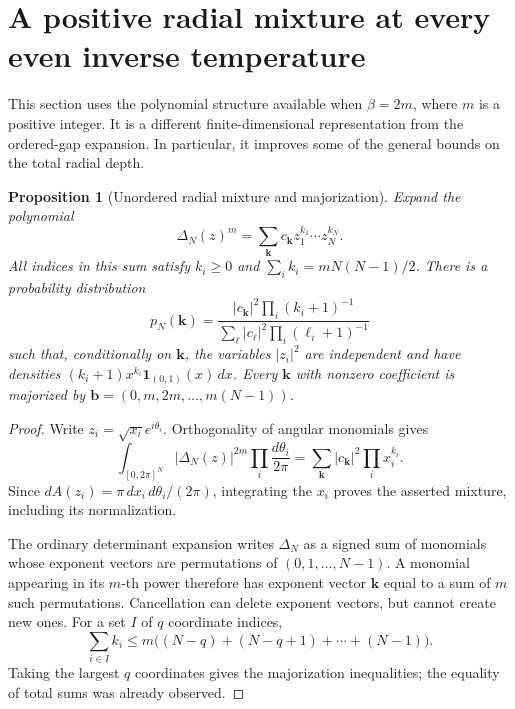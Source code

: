 \documentclass[11pt,a4paper]{article}
\numberwithin{equation}{section}
\newtheorem{proposition}[theorem]{Proposition}
\theoremstyle{definition}
\theoremstyle{remark}
\begin{document}
\section{A positive radial mixture at every even inverse temperature}
\label{sec:even-beta-radial-mixture}

This section uses the polynomial structure available when $\beta=2m$,
where $m$ is a positive integer. It is a different finite-dimensional
representation from the ordered-gap expansion. In particular, it improves
some of the general bounds on the total radial depth.

\begin{proposition}[Unordered radial mixture and majorization]
\label{prop:even-beta-radial-mixture}
Expand the polynomial
\[
 \Delta_N(z)^m=\sum_{\mathbf k}c_{\mathbf k}
                    z_1^{k_1}\cdots z_N^{k_N}.
\]
All indices in this sum satisfy $k_i\geq0$ and
$\sum_i k_i=mN(N-1)/2$. There is a probability distribution
\begin{equation}
 p_N(\mathbf k)=
 \frac{|c_{\mathbf k}|^2\prod_i(k_i+1)^{-1}}
      {\sum_{\boldsymbol\ell}|c_{\boldsymbol\ell}|^2
                           \prod_i(\ell_i+1)^{-1}}
 \label{eq:even-beta-occupation-mixture}
\end{equation}
such that, conditionally on $\mathbf k$, the variables
$|z_i|^2$ are independent and have densities
$(k_i+1)x^{k_i}\mathbf1_{(0,1)}(x)\,dx$.
Every $\mathbf k$ with nonzero coefficient is majorized by
$\mathbf b=(0,m,2m,\ldots,m(N-1))$.
\end{proposition}

\begin{proof}
Write $z_i=\sqrt{x_i}e^{i\theta_i}$. Orthogonality of angular monomials
gives
\[
 \int_{[0,2\pi]^N}|\Delta_N(z)|^{2m}
                         \prod_i\frac{d\theta_i}{2\pi}
 =\sum_{\mathbf k}|c_{\mathbf k}|^2\prod_i x_i^{k_i}.
\]
Since $dA(z_i)=\pi\,dx_i\,d\theta_i/(2\pi)$, integrating the $x_i$
proves the asserted mixture, including its normalization.

The ordinary determinant expansion writes $\Delta_N$ as a signed sum
of monomials whose exponent vectors are permutations of
$(0,1,\ldots,N-1)$. A monomial appearing in its $m$-th power therefore
has exponent vector $\mathbf k$ equal to a sum of $m$ such permutations.
Cancellation can delete exponent vectors, but cannot create new ones.
For a set $I$ of $q$ coordinate indices,
\[
 \sum_{i\in I}k_i
 \leq m\big((N-q)+(N-q+1)+\cdots+(N-1)\big).
\]
Taking the largest $q$ coordinates gives the majorization inequalities;
the equality of total sums was already observed.
\end{proof}
\end{document}
